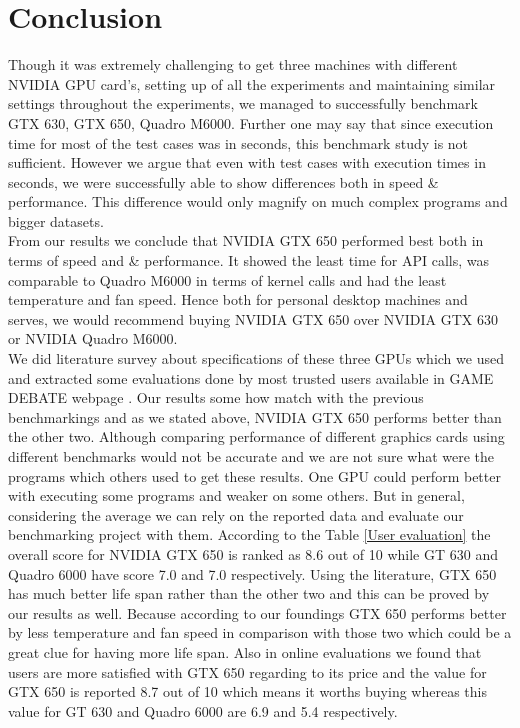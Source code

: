 \documentclass[paper=a4, fontsize=11pt]{scrartcl}
\numberwithin{equation}{section}		%
\numberwithin{figure}{section}			%
\numberwithin{table}{section}				%
\begin{document}
\newpage
\section{Conclusion}

Though it was extremely challenging to get three machines with different NVIDIA GPU card's, setting up of all the experiments and maintaining  similar settings throughout the experiments, we managed to successfully benchmark GTX 630, GTX 650, Quadro M6000. Further one may say that since execution time for most of the test cases was in seconds, this benchmark study is not sufficient. However we argue that even with test cases with execution times in seconds, we were successfully able to show differences both in speed \& performance. This difference would only magnify on much complex programs and bigger datasets. \\

From our results we conclude that NVIDIA GTX 650 performed best both in terms of speed and \& performance. It showed the least time for API calls, was comparable to Quadro M6000 in terms of kernel calls and had the least temperature and fan speed. Hence both for personal desktop machines and serves, we would recommend buying NVIDIA GTX 650 over NVIDIA GTX 630 or NVIDIA Quadro M6000. \\

We did literature survey about specifications of these three GPUs which we used and extracted some evaluations done by most trusted users available in GAME DEBATE webpage \cite{game_debate}. Our results some how match with the previous benchmarkings and as we stated above, NVIDIA GTX 650 performs better than the other two. Although comparing performance of different graphics cards using different benchmarks would not be accurate and we are not sure what were the programs which others used to get these results. One GPU could perform better with executing some programs and weaker on some others. But in general, considering the average we can rely on the reported data and evaluate our benchmarking project with them. According to the Table \ref{User evaluation} the overall score for NVIDIA GTX 650 is ranked as 8.6 out of 10 while GT 630 and Quadro 6000 have score 7.0 and 7.0 respectively. Using the literature, GTX 650 has much better life span rather than the other two and this can be proved by our results as well. Because according to our foundings GTX 650 performs better by less temperature and fan speed in comparison with those two which could be a great clue for having more life span. Also in online evaluations we found that users are more satisfied with GTX 650 regarding to its price and the value for GTX 650 is reported 8.7 out of 10 which means it worths buying whereas this value for GT 630 and Quadro 6000 are 6.9 and 5.4 respectively. \\
\end{document}
